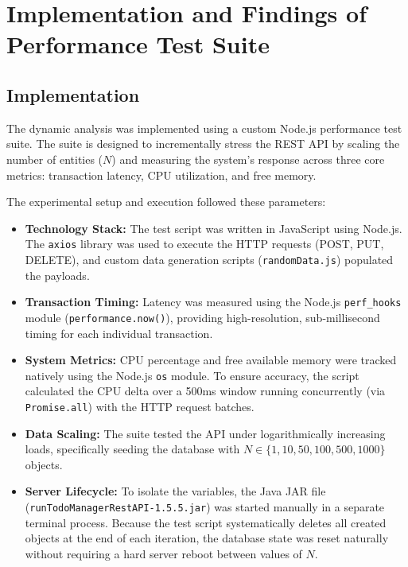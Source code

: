 \documentclass[11pt,a4paper]{article}
\begin{document}
\section{Implementation and Findings of Performance Test Suite}

\subsection{Implementation}

The dynamic analysis was implemented using a custom Node.js performance test suite. The suite is designed to incrementally stress the REST API by scaling the number of entities ($N$) and measuring the system's response across three core metrics: transaction latency, CPU utilization, and free memory.

The experimental setup and execution followed these parameters:
\begin{itemize}
    \item \textbf{Technology Stack:} The test script was written in JavaScript using Node.js. The \texttt{axios} library was used to execute the HTTP requests (POST, PUT, DELETE), and custom data generation scripts (\texttt{randomData.js}) populated the payloads.
    \item \textbf{Transaction Timing:} Latency was measured using the Node.js \texttt{perf\_hooks} module (\texttt{performance.now()}), providing high-resolution, sub-millisecond timing for each individual transaction.
    \item \textbf{System Metrics:} CPU percentage and free available memory were tracked natively using the Node.js \texttt{os} module. To ensure accuracy, the script calculated the CPU delta over a 500ms window running concurrently (via \texttt{Promise.all}) with the HTTP request batches.
    \item \textbf{Data Scaling:} The suite tested the API under logarithmically increasing loads, specifically seeding the database with $N \in \{1, 10, 50, 100, 500, 1000\}$ objects.
    \item \textbf{Server Lifecycle:} To isolate the variables, the Java JAR file (\texttt{runTodoManagerRestAPI-1.5.5.jar}) was started manually in a separate terminal process. Because the test script systematically deletes all created objects at the end of each iteration, the database state was reset naturally without requiring a hard server reboot between values of $N$.
\end{itemize}
\end{document}
